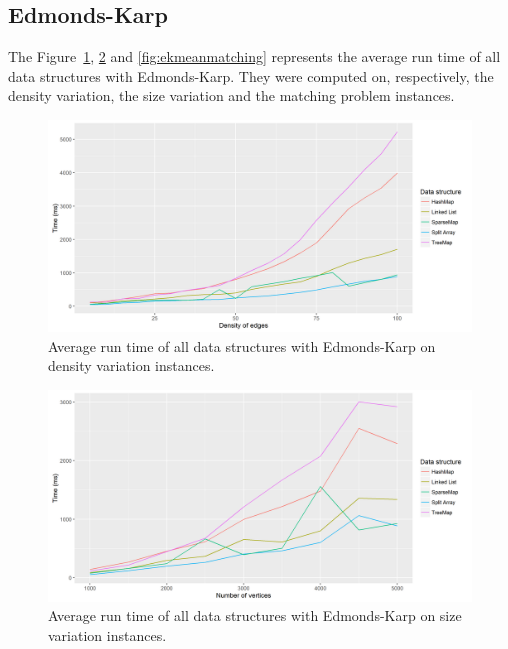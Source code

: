 \subsection{Edmonds-Karp}
The Figure~\ref{fig:ekmeandensity}, \ref{fig:ekmeansize} and \ref{fig:ekmeanmatching} represents the average run time of all data structures with Edmonds-Karp. They were computed on, respectively, the density variation, the size variation and the matching problem instances.
\begin{figure}[H]
\begin{center}
\includegraphics[scale=0.5]{images/results/ekmeandensity.png}
\caption{Average run time of all data structures with Edmonds-Karp on density variation instances.}
\label{fig:ekmeandensity}
\end{center}
\end{figure}
\begin{figure}[H]
\begin{center}
\includegraphics[scale=0.5]{images/results/ekmeansize.png}
\caption{Average run time of all data structures with Edmonds-Karp on size variation instances.}
\label{fig:ekmeansize}
\end{center}
\end{figure}
